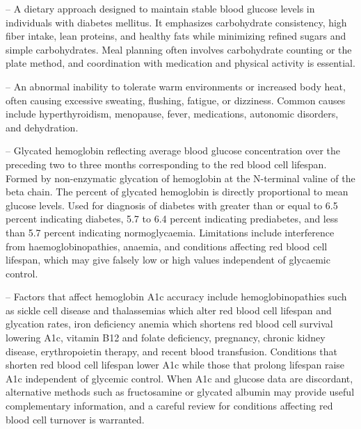 -- A dietary approach designed to maintain stable blood glucose levels in individuals with diabetes mellitus. It emphasizes carbohydrate consistency, high fiber intake, lean proteins, and healthy fats while minimizing refined sugars and simple carbohydrates. Meal planning often involves carbohydrate counting or the plate method, and coordination with medication and physical activity is essential.

-- An abnormal inability to tolerate warm environments or increased body heat, often causing excessive sweating, flushing, fatigue, or dizziness. Common causes include hyperthyroidism, menopause, fever, medications, autonomic disorders, and dehydration.

-- Glycated hemoglobin reflecting average blood glucose concentration over the preceding two to three months corresponding to the red blood cell lifespan. Formed by non-enzymatic glycation of hemoglobin at the N-terminal valine of the beta chain. The percent of glycated hemoglobin is directly proportional to mean glucose levels. Used for diagnosis of diabetes with greater than or equal to 6.5 percent indicating diabetes, 5.7 to 6.4 percent indicating prediabetes, and less than 5.7 percent indicating normoglycaemia. Limitations include interference from haemoglobinopathies, anaemia, and conditions affecting red blood cell lifespan, which may give falsely low or high values independent of glycaemic control.

-- Factors that affect hemoglobin A1c accuracy include hemoglobinopathies such as sickle cell disease and thalassemias which alter red blood cell lifespan and glycation rates, iron deficiency anemia which shortens red blood cell survival lowering A1c, vitamin B12 and folate deficiency, pregnancy, chronic kidney disease, erythropoietin therapy, and recent blood transfusion. Conditions that shorten red blood cell lifespan lower A1c while those that prolong lifespan raise A1c independent of glycemic control. When A1c and glucose data are discordant, alternative methods such as fructosamine or glycated albumin may provide useful complementary information, and a careful review for conditions affecting red blood cell turnover is warranted.

